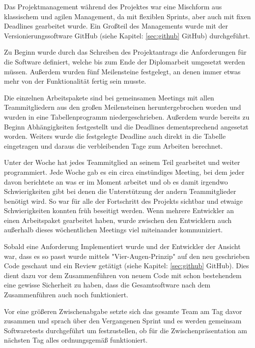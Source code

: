 \label{sec:ProManZELIA}

Das Projektmanagement während des Projektes war eine Mischform aus klassischem und agilen Management, da mit flexiblen Sprints, aber auch mit fixen Deadlines gearbeitet wurde. Ein Großteil des Managements wurde mit der Versionierungssoftware GitHub (siehe Kapitel: \ref{sec:github} GitHub) durchgeführt.

Zu Beginn wurde durch das Schreiben des Projektantrags die Anforderungen für die Software definiert, welche bis zum Ende der Diplomarbeit umgesetzt werden müssen. Außerdem wurden fünf Meilensteine festgelegt, an denen immer etwas mehr von der Funktionalität fertig sein musste.

Die einzelnen Arbeitspakete sind bei gemeinsamen Meetings mit allen Teammitgliedern aus den großen Meilensteinen heruntergebrochen worden und wurden in eine Tabellenprogramm niedergeschrieben. Außerdem wurde bereits zu Beginn Abhängigkeiten festgestellt und die Deadlines dementsprechend angesetzt worden. Weiters wurde die festgelegte Deadline auch direkt in die Tabelle eingetragen und daraus die verbleibenden Tage zum Arbeiten berechnet.  

Unter der Woche hat jedes Teammitglied an seinem Teil gearbeitet und weiter programmiert. Jede Woche gab es ein circa einstündiges Meeting, bei dem jeder davon berichtete an was er im Moment arbeitet und ob es damit irgendwo Schwierigkeiten gibt bei denen die Unterstützung der andern Teammitglieder benötigt wird. So war für alle der Fortschritt des Projekts sichtbar und etwaige Schwierigkeiten konnten früh beseitigt werden. Wenn mehrere Entwickler an einen Arbeitspaket gearbeitet haben, wurde zwischen den Entwicklern auch außerhalb dieses wöchentlichen Meetings viel miteinander kommuniziert.

Sobald eine Anforderung Implementiert wurde und der Entwickler der Ansicht war, dass es so passt wurde mittels "Vier-Augen-Prinzip" auf den neu geschrieben Code geschaut und ein Review getätigt (siehe Kapitel: \ref{sec:github} GitHub). Dies dient dazu vor dem Zusammenführen von neuem Code mit schon bestehendem eine gewisse Sicherheit zu haben, dass die Gesamtsoftware nach dem Zusammenführen auch noch funktioniert.

Vor eine größeren Zwischenabgabe setzte sich das gesamte Team am Tag davor zusammen und sprach über den Vergangenen Sprint und es werden gemeinsam Softwaretests durchgeführt um festzustellen, ob für die Zwischenpräsentation am nächsten Tag alles ordnungsgemäß funktioniert. 
